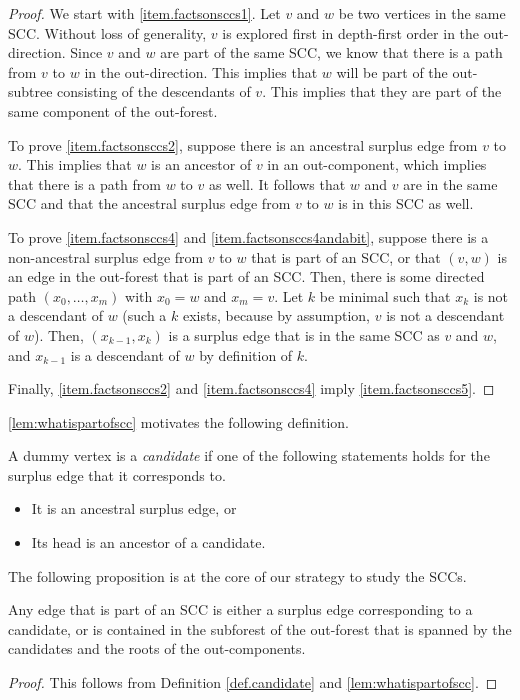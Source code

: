 \begin{proof}
We start with \ref{item.factsonsccs1}. Let $v$ and $w$ be two vertices in the same SCC. Without loss of generality, $v$ is explored first in depth-first order in the out-direction. Since $v$ and $w$ are part of the same SCC, we know that there is a path from $v$ to $w$ in the out-direction. This implies that $w$ will be part of the out-subtree consisting of the descendants of $v$. This implies that they are part of the same component of the out-forest.

To prove \ref{item.factsonsccs2}, suppose there is an ancestral surplus edge from $v$ to $w$. This implies that $w$ is an ancestor of $v$ in an out-component, which implies that there is a path from $w$ to $v$ as well. It follows that $w$ and $v$ are in the same SCC and that the ancestral surplus edge from $v$ to $w$ is in this SCC as well. 

To prove \ref{item.factsonsccs4} and \ref{item.factsonsccs4andabit}, suppose there is a non-ancestral surplus edge from $v$ to $w$ that is part of an SCC, or that $(v,w)$ is an edge in the out-forest that is part of an SCC. Then, there is some directed path $(x_0,\dots, x_m)$ with $x_0=w$ and $x_m=v$. Let $k$ be minimal such that $x_k$ is not a descendant of $w$ (such a $k$ exists, because by assumption, $v$ is not a descendant of $w$). Then, $(x_{k-1},x_k)$ is a surplus edge that is in the same SCC as $v$ and $w$, and $x_{k-1}$ is a descendant of $w$ by definition of $k$.


Finally, \ref{item.factsonsccs2} and \ref{item.factsonsccs4} imply \ref{item.factsonsccs5}. 
\end{proof}
 \cref{lem:whatispartofscc} motivates the following definition.
\begin{definition}\label{def.candidate}
A dummy vertex is a \emph{candidate} if one of the following statements holds for the surplus edge that it corresponds to. 
\begin{itemize}
    \item It is an ancestral surplus edge, or
    \item Its head is an ancestor of a candidate.
\end{itemize}
\end{definition}
The following proposition is at the core of our strategy to study the SCCs.
\begin{proposition}\label{prop:edgesinSCCs}
Any edge that is part of an SCC is either a surplus edge corresponding to a candidate, or is contained in the subforest of the out-forest that is spanned by the candidates and the roots of the out-components.
\end{proposition}
\begin{proof}
This follows from Definition \ref{def.candidate} and \cref{lem:whatispartofscc}.
\end{proof}

